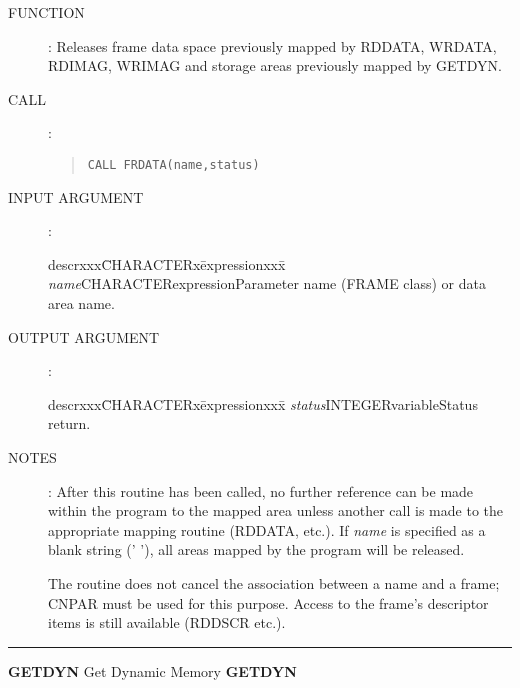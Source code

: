 \begin{description}
\item [FUNCTION]:
Releases frame data space previously mapped by RDDATA, WRDATA, RDIMAG, WRIMAG
and storage areas previously mapped by GETDYN.
\item [CALL]:
\begin{quote}
{\tt CALL FRDATA(name,status)}
\end{quote}
\item [INPUT ARGUMENT]:
\begin{tabbing}
descrxxx\=CHARACTERx\=expressionxxx\=\kill
{\em name}\>CHARACTER\>expression\>Parameter name (FRAME class) or data area name.
\end{tabbing}
\item [OUTPUT ARGUMENT]:
\begin{tabbing}
descrxxx\=CHARACTERx\=expressionxxx\=\kill
{\em status}\>INTEGER\>variable\>Status return.
\end{tabbing}
\item [NOTES]:
After this routine has been called, no further reference can be made within the
program to the mapped area unless another call is made to the appropriate
mapping routine (RDDATA, etc.).
If {\em name} is specified as a blank string (' '), all areas mapped by the
program will be released.

The routine does not cancel the association between a name and a frame; CNPAR
must be used for this purpose.
Access to the frame's descriptor items is still available (RDDSCR etc.).
\end{description}
\rule{\textwidth}{0.3mm}
{\Large {\bf GETDYN} \hfill Get Dynamic Memory \hfill {\bf GETDYN}}
